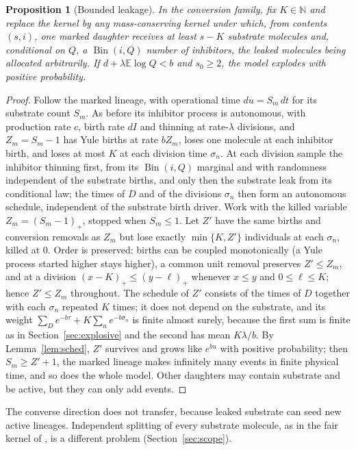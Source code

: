 \documentclass[11pt,a4paper]{article}
\numberwithin{equation}{section}
\newtheorem{proposition}[theorem]{Proposition}
\theoremstyle{definition}\newtheorem{definition}[theorem]{Definition}
\theoremstyle{remark}\newtheorem{remark}[theorem]{Remark}\newtheorem{example}[theorem]{Example}
\newcommand{\E}{\mathbb E}
\newcommand{\N}{\mathbb N}
\newcommand{\Bin}{\operatorname{Bin}}
\begin{document}
\begin{proposition}[Bounded leakage]\label{prop:leakage}
In the conversion family, fix $K\in\N$ and replace the kernel by any mass-conserving kernel under which, from contents $(s,i)$, one marked daughter receives at least $s-K$ substrate molecules and, conditional on $Q$, a $\Bin(i,Q)$ number of inhibitors, the leaked molecules being allocated arbitrarily. If $d+\lambda\E\log Q<b$ and $s_0\ge2$, the model explodes with positive probability.
\end{proposition}

\begin{proof}
Follow the marked lineage, with operational time $du=S_m\,dt$ for its substrate count $S_m$. As before its inhibitor process is autonomous, with production rate $c$, birth rate $dI$ and thinning at rate-$\lambda$ divisions, and $Z_m=S_m-1$ has Yule births at rate $bZ_m$, loses one molecule at each inhibitor birth, and loses at most $K$ at each division time $\sigma_n$. At each division sample the inhibitor thinning first, from its $\Bin(i,Q)$ marginal and with randomness independent of the substrate births, and only then the substrate leak from its conditional law; the times of $D$ and of the divisions $\sigma_n$ then form an autonomous schedule, independent of the substrate birth driver. Work with the killed variable $Z_m=(S_m-1)_+$, stopped when $S_m\le1$. Let $Z'$ have the same births and conversion removals as $Z_m$ but lose exactly $\min\{K,Z'\}$ individuals at each $\sigma_n$, killed at $0$. Order is preserved: births can be coupled monotonically (a Yule process started higher stays higher), a common unit removal preserves $Z'\le Z_m$, and at a division $(x-K)_+\le(y-\ell)_+$ whenever $x\le y$ and $0\le\ell\le K$; hence $Z'\le Z_m$ throughout. The schedule of $Z'$ consists of the times of $D$ together with each $\sigma_n$ repeated $K$ times; it does not depend on the substrate, and its weight $\sum_{D}e^{-b\tau}+K\sum_ne^{-b\sigma_n}$ is finite almost surely, because the first sum is finite as in Section~\ref{sec:explosive} and the second has mean $K\lambda/b$. By Lemma~\ref{lem:sched}, $Z'$ survives and grows like $e^{bu}$ with positive probability; then $S_m\ge Z'+1$, the marked lineage makes infinitely many events in finite physical time, and so does the whole model. Other daughters may contain substrate and be active, but they can only add events.
\end{proof}

The converse direction does not transfer, because leaked substrate can seed new active lineages. Independent splitting of every substrate molecule, as in the fair kernel of \cite{AHRLL2026}, is a different problem (Section~\ref{sec:scope}).
\end{document}

